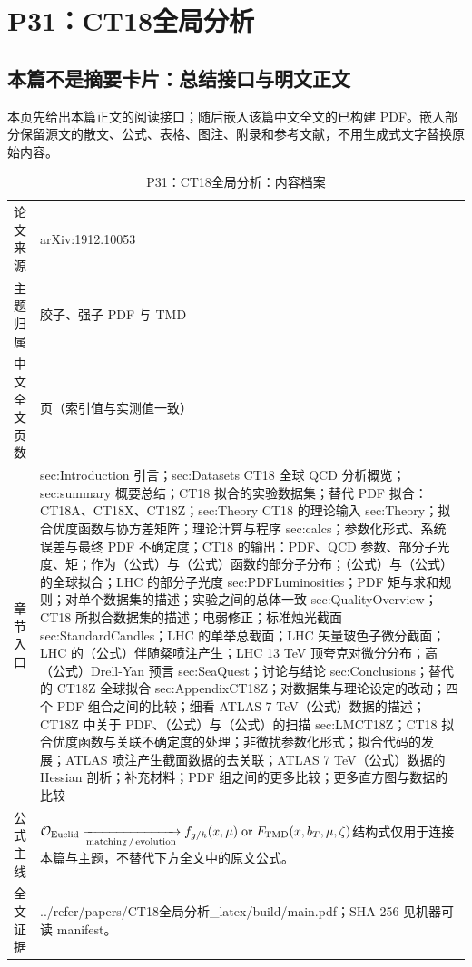 \documentclass[UTF8,11pt,oneside]{ctexbook}
\begin{document}
\chapter{P31：CT18全局分析}
\section*{本篇不是摘要卡片：总结接口与明文正文}
本页先给出本篇正文的阅读接口；随后嵌入该篇中文全文的已构建 PDF。嵌入部分保留源文的散文、公式、表格、图注、附录和参考文献，不用生成式文字替换原始内容。
\begin{table}[htbp]
  \centering
  \caption{P31：CT18全局分析：内容档案}
  \small
  \begin{tabularx}{0.96\textwidth}{@{}p{3.3cm}>{\raggedright\arraybackslash}X@{}}
    \toprule
    论文来源 & arXiv:1912.10053 \\
    主题归属 & 胶子、强子 PDF 与 TMD \\
    中文全文页数 & 143 页（索引值与实测值一致） \\
    章节入口 & sec:Introduction 引言；sec:Datasets CT18 全球 QCD 分析概览；sec:summary 概要总结；CT18 拟合的实验数据集；替代 PDF 拟合：CT18A、CT18X、CT18Z；sec:Theory CT18 的理论输入 sec:Theory；拟合优度函数与协方差矩阵；理论计算与程序 sec:calcs；参数化形式、系统误差与最终 PDF 不确定度；CT18 的输出：PDF、QCD 参数、部分子光度、矩；作为（公式）与（公式）函数的部分子分布；（公式）与（公式）的全球拟合；LHC 的部分子光度 sec:PDFLuminosities；PDF 矩与求和规则；对单个数据集的描述；实验之间的总体一致 sec:QualityOverview；CT18 所拟合数据集的描述；电弱修正；标准烛光截面 sec:StandardCandles；LHC 的单举总截面；LHC 矢量玻色子微分截面；LHC 的（公式）伴随粲喷注产生；LHC 13 TeV 顶夸克对微分分布；高（公式）Drell-Yan 预言 sec:SeaQuest；讨论与结论 sec:Conclusions；替代的 CT18Z 全球拟合 sec:AppendixCT18Z；对数据集与理论设定的改动；四个 PDF 组合之间的比较；细看 ATLAS 7 TeV（公式）数据的描述；CT18Z 中关于 PDF、（公式）与（公式）的扫描 sec:LMCT18Z；CT18 拟合优度函数与关联不确定度的处理；非微扰参数化形式；拟合代码的发展；ATLAS 喷注产生截面数据的去关联；ATLAS 7 TeV（公式）数据的 Hessian 剖析；补充材料；PDF 组之间的更多比较；更多直方图与数据的比较 \\
    公式主线 & $\mathcal O_{\rm Euclid}\xrightarrow[\rm matching\,/\,evolution]{}f_{g/h}(x,\mu)\;{\rm or}\;F_{\rm TMD}(x,b_T,\mu,\zeta)$\newline\scriptsize 结构式仅用于连接本篇与主题，不替代下方全文中的原文公式。 \\
    全文证据 & ../\allowbreak{}refer/\allowbreak{}papers/\allowbreak{}CT18全局分析\_\allowbreak{}latex/\allowbreak{}build/\allowbreak{}main.pdf；SHA-256 见机器可读 manifest。 \\
    \bottomrule
  \end{tabularx}
\end{table}
\end{document}
